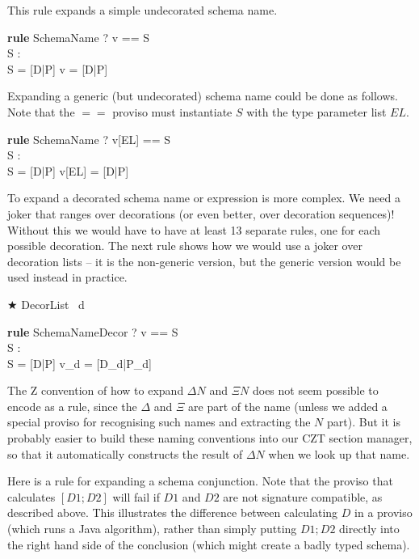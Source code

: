 \documentclass{article}
\newenvironment{zedrule}[1]{\par\textbf{rule }#1\vspace{-2ex}\infrule}{\endinfrule}
\newcommand{\derives}{\derive{}}
\newenvironment{zedjoker}[1]{\par$\bigstar$ #1\ }{}
\newcommand{\proviso}{\raisebox{0.5ex}{${}_{\blacktriangleright}\ $}}%
\begin{document}
This rule expands a simple undecorated schema name.
\begin{zedrule}{SchemaName}
  \proviso? v == S \\
  \proviso S : \power [\_] \\
  S = [D|P]
\derives
  v = [D|P]
\end{zedrule}

Expanding a generic (but undecorated) schema name
could be done as follows.  Note that the $==$ proviso
must instantiate $S$ with the type parameter list $EL$.
\begin{zedrule}{SchemaName}
  \proviso? v[EL] == S \\
  \proviso S : \power [\_] \\
  S = [D|P]
\derives
  v[EL] = [D|P]
\end{zedrule}

To expand a decorated schema name or expression is more complex.
We need a joker that ranges over decorations 
(or even better, over decoration sequences)!
Without this we would have to have at least 13 separate rules,
one for each possible decoration.  The next rule shows
how we would use a joker over decoration lists -- it is
the non-generic version, but the generic version would
be used instead in practice.

\begin{zedjoker}{DecorList} d \end{zedjoker}

\begin{zedrule}{SchemaNameDecor}
  \proviso? v == S \\
  \proviso S : \power [\_] \\
  S = [D|P]
\derives
  v_d = [D_d|P_d]
\end{zedrule}

The Z convention of how to expand $\Delta N$ and $\Xi N$
does not seem possible to encode as a rule, since the $\Delta$
and $\Xi$ are part of the name (unless we added a
special proviso for recognising such names and extracting the $N$
part).  But it is probably easier to build these naming conventions
into our CZT section manager, so that it automatically constructs
the result of $\Delta N$ when we look up that name.

Here is a rule for expanding a schema conjunction.
Note that the proviso that calculates $[D1;D2]$ will fail
if $D1$ and $D2$ are not signature compatible, as described above.
This illustrates the difference between calculating $D$ in
a proviso (which runs a Java algorithm), rather than simply
putting $D1;D2$ directly into the right hand side of the
conclusion (which might create a badly typed schema).
\end{document}
